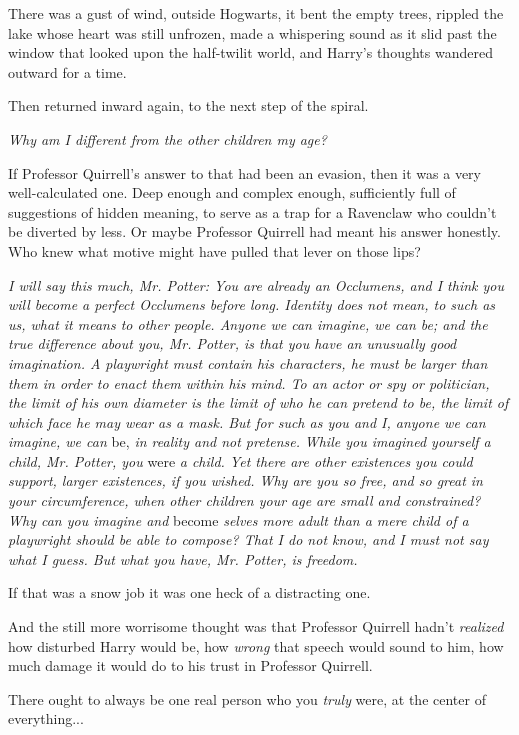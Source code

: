 There was a gust of wind, outside Hogwarts, it bent the empty trees, rippled the lake whose heart was still unfrozen, made a whispering sound as it slid past the window that looked upon the half-twilit world, and Harry's thoughts wandered outward for a time.

Then returned inward again, to the next step of the spiral.

\emph{Why am I different from the other children my age?}

If Professor Quirrell's answer to that had been an evasion, then it was a very well-calculated one. Deep enough and complex enough, sufficiently full of suggestions of hidden meaning, to serve as a trap for a Ravenclaw who couldn't be diverted by less. Or maybe Professor Quirrell had meant his answer honestly. Who knew what motive might have pulled that lever on those lips?

\emph{I will say this much, Mr. Potter: You are already an Occlumens, and I think you will become a perfect Occlumens before long. Identity does not mean, to such as us, what it means to other people. Anyone we can imagine, we can be; and the true difference about you, Mr. Potter, is that you have an unusually good imagination. A playwright must contain his characters, he must be larger than them in order to enact them within his mind. To an actor or spy or politician, the limit of his own diameter is the limit of who he can pretend to be, the limit of which face he may wear as a mask. But for such as you and I, anyone we can imagine, we can} be, \emph{in reality and not pretense.} \emph{While you imagined yourself a child, Mr. Potter, you} were \emph{a child. Yet there are other existences you could support, larger existences, if you wished. Why are you so free, and so great in your circumference, when other children your age are small and constrained? Why can you imagine and} become \emph{selves more adult than a mere child of a playwright should be able to compose? That I do not know, and I must not say what I guess. But what you have, Mr. Potter, is freedom.}

If that was a snow job it was one heck of a distracting one.

And the still more worrisome thought was that Professor Quirrell hadn't \emph{realized} how disturbed Harry would be, how \emph{wrong} that speech would sound to him, how much damage it would do to his trust in Professor Quirrell.

There ought to always be one real person who you \emph{truly} were, at the center of everything...

